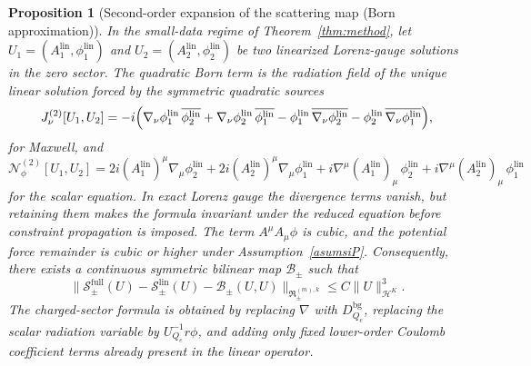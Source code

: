 \documentclass[11pt]{article}
\numberwithin{equation}{section}
\theoremstyle{plain}
\newtheorem{proposition}[theorem]{Proposition}
\theoremstyle{definition}
\theoremstyle{remark}
\begin{document}
\begin{proposition}[Second-order expansion of the scattering map (Born approximation)]\label{prop:born-expansion}
In the small-data regime of Theorem~\ref{thm:method}, let $U_1=(A_1^{\mathrm{lin}},\phi_1^{\mathrm{lin}})$ and $U_2=(A_2^{\mathrm{lin}},\phi_2^{\mathrm{lin}})$ be two linearized Lorenz-gauge solutions in the zero sector. The quadratic Born term is the radiation field of the unique linear solution forced by the symmetric quadratic sources
\begin{equation}
J_\nu^{(2)}[U_1,U_2]
=
-i\Bigl(
\nabla_\nu\phi_1^{\mathrm{lin}}\,\overline{\phi_2^{\mathrm{lin}}}
+\nabla_\nu\phi_2^{\mathrm{lin}}\,\overline{\phi_1^{\mathrm{lin}}}
-\phi_1^{\mathrm{lin}}\,\overline{\nabla_\nu\phi_2^{\mathrm{lin}}}
-\phi_2^{\mathrm{lin}}\,\overline{\nabla_\nu\phi_1^{\mathrm{lin}}}
\Bigr),
\end{equation}
for Maxwell, and
\begin{equation}
\mathcal N_\phi^{(2)}[U_1,U_2]
=
2i(A_1^{\mathrm{lin}})^\mu\nabla_\mu\phi_2^{\mathrm{lin}}
+2i(A_2^{\mathrm{lin}})^\mu\nabla_\mu\phi_1^{\mathrm{lin}}
+i\nabla^\mu(A_1^{\mathrm{lin}})_\mu\,\phi_2^{\mathrm{lin}}
+i\nabla^\mu(A_2^{\mathrm{lin}})_\mu\,\phi_1^{\mathrm{lin}}
\end{equation}
for the scalar equation. In exact Lorenz gauge the divergence terms vanish, but retaining them makes the formula invariant under the reduced equation before constraint propagation is imposed. The term $A^\mu A_\mu\phi$ is cubic, and the potential force remainder is cubic or higher under Assumption~\ref{asumsiP}. Consequently, there exists a continuous symmetric bilinear map $\mathscr B_\pm$ such that
\begin{equation}\label{eq:cubic-scattering}
\bigl\|\mathscr S_{\pm}^{\mathrm{full}}(U)-\mathscr S_{\pm}^{\mathrm{lin}}(U)-\mathscr B_{\pm}(U,U)\bigr\|_{\mathfrak R_\pm^{(m),k}}
\le C\|U\|_{\mathcal H^K}^{3}.
\end{equation}
The charged-sector formula is obtained by replacing $\nabla$ with $D_{Q_e}^{\mathrm{bg}}$, replacing the scalar radiation variable by $U_{Q_e}^{-1}r\phi$, and adding only fixed lower-order Coulomb coefficient terms already present in the linear operator.
\end{proposition}
\end{document}
